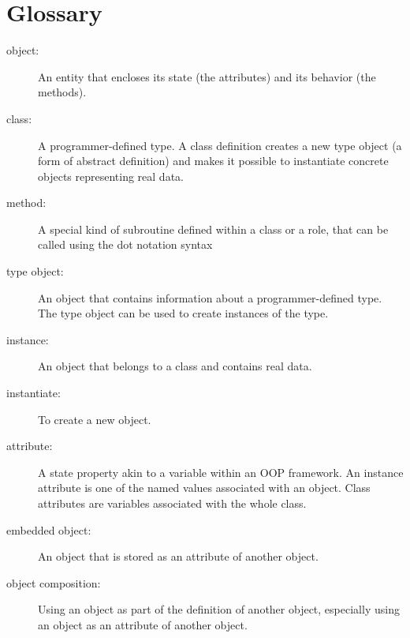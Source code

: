 \section{Glossary}

\begin{description}

\item[object:] An entity that encloses its state (the attributes) 
and its behavior (the methods).

\item[class:] A programmer-defined type.  A class definition 
creates a new type object (a form of abstract definition) and 
makes it possible to instantiate concrete objects representing 
real data.

\item[method:] A special kind of subroutine defined within a class or a role, that can be called using the dot notation syntax

\item[type object:] An object that contains information about a
programmer-defined type.  The type object can be used to create instances
of the type.

\item[instance:] An object that belongs to a class and contains 
real data.

\item[instantiate:] To create a new object.

\item[attribute:] A state property akin to a variable within 
an OOP framework. An instance attribute is one of the named 
values associated with an object. Class attributes are variables 
associated with the whole class. 

\item[embedded object:] An object that is stored as an attribute
of another object.

\item[object composition:] Using an object as part of the definition 
of another object, especially using an object as an attribute of 
another object.


\end{description}
